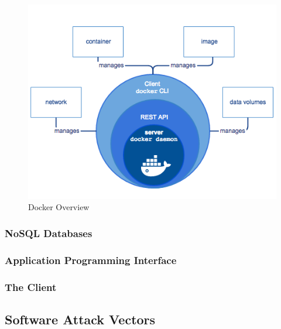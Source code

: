 \begin{figure}
    \centering
    \includegraphics[width=\textwidth]{../../img/chapter_2/docker.png}
    \caption{Docker Overview}
    \label{fig:docker-overview}
\end{figure}

\subsubsection{NoSQL Databases}

\subsubsection{Application Programming Interface}

\subsubsection{The Client}

\subsection{Software Attack Vectors}


